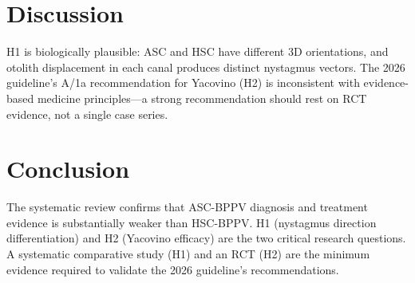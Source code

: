 \documentclass[11pt]{article}
\begin{document}
\section{Discussion}
H1 is biologically plausible: ASC and HSC have different 3D orientations, and otolith displacement in each canal produces distinct nystagmus vectors. The 2026 guideline's A/1a recommendation for Yacovino (H2) is inconsistent with evidence-based medicine principles---a strong recommendation should rest on RCT evidence, not a single case series.
\section{Conclusion}
The systematic review confirms that ASC-BPPV diagnosis and treatment evidence is substantially weaker than HSC-BPPV. H1 (nystagmus direction differentiation) and H2 (Yacovino efficacy) are the two critical research questions. A systematic comparative study (H1) and an RCT (H2) are the minimum evidence required to validate the 2026 guideline's recommendations.
\end{document}
